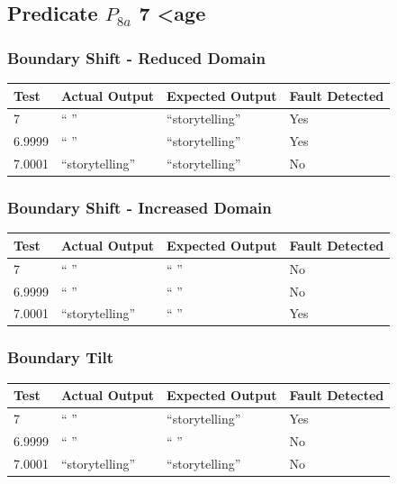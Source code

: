 \documentclass[11pt, oneside]{article}   	%
\begin{document}
\subsection{Predicate $P_{8a}$ 7 \textless age}
\subsubsection{Boundary Shift - Reduced Domain}
\begin{table}[!htb]
\centering
\begin{tabular}{|l|l|l|l|}
\hline
Test   & Actual Output  & Expected Output & Fault Detected \\ \hline
7      & “ ”            & “storytelling”  & Yes            \\ \hline
6.9999 & “ ”            & “storytelling”  & Yes            \\ \hline
7.0001 & “storytelling” & “storytelling”  & No             \\ \hline
\end{tabular}
\end{table}

\subsubsection{Boundary Shift - Increased Domain}
\begin{table}[!htb]
\centering
\begin{tabular}{|l|l|l|l|}
\hline
Test   & Actual Output  & Expected Output & Fault Detected \\ \hline
7      & “ ”            & “ ”             & No             \\ \hline
6.9999 & “ ”            & “ ”             & No             \\ \hline
7.0001 & “storytelling” & “ ”             & Yes            \\ \hline
\end{tabular}
\end{table}

\subsubsection{Boundary Tilt}
\begin{table}[!htb]
\centering
\begin{tabular}{|l|l|l|l|}
\hline
Test   & Actual Output  & Expected Output & Fault Detected \\ \hline
7      & “ ”            & “storytelling”  & Yes            \\ \hline
6.9999 & “ ”            & “ ”             & No             \\ \hline
7.0001 & “storytelling” & “storytelling”  & No             \\ \hline
\end{tabular}
\end{table}
\end{document}
